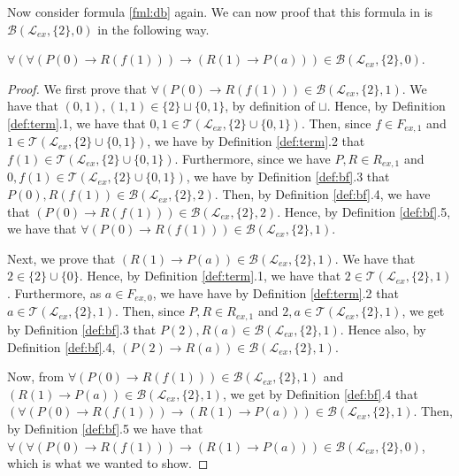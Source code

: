 Now consider formula \ref{fml:db} again. We can now proof that this formula in is $\mathcal{B}(\mathcal{L}_{ex},\{2\},0)$ in the following way.
\begin{lemma} $\forall(\forall(P(0) \rightarrow R(f(1))) \to (R(1) \to P(a))) \in \mathcal{B}(\mathcal{L}_{ex},\{2\},0)$.
\end{lemma}
\begin{proof}
  We first prove that $\forall(P(0) \rightarrow R(f(1))) \in \mathcal{B}(\mathcal{L}_{ex},\{2\},1)$. We have that $(0,1), (1,1) \in \{2\} \sqcup \{0,1\}$, by definition of $\sqcup$. Hence, by Definition \ref{def:term}.1, we have that $0, 1 \in \mathcal{T}(\mathcal{L}_{ex}, \{2\} \cup \{0,1\})$. Then, since $f \in F_{ex,1}$ and $1 \in \mathcal{T}(\mathcal{L}_{ex}, \{2\} \cup \{0,1\})$, we have by Definition \ref{def:term}.2 that $f(1) \in \mathcal{T}(\mathcal{L}_{ex}, \{2\} \cup \{0,1\})$. Furthermore, since we have $P, R \in R_{ex,1}$ and $0, f(1) \in \mathcal{T}(\mathcal{L}_{ex}, \{2\} \cup \{0,1\})$, we have by Definition \ref{def:bf}.3 that $P(0), R(f(1)) \in \mathcal{B}(\mathcal{L}_{ex},\{2\},2)$. Then, by Definition \ref{def:bf}.4, we have that $(P(0) \rightarrow R(f(1))) \in \mathcal{B}(\mathcal{L}_{ex},\{2\},2)$. Hence, by Definition \ref{def:bf}.5, we have that $\forall(P(0) \rightarrow R(f(1))) \in \mathcal{B}(\mathcal{L}_{ex},\{2\},1)$.

  Next, we prove that $(R(1) \to P(a)) \in \mathcal{B}(\mathcal{L}_{ex},\{2\},1)$. We have that $2 \in \{2\} \cup \{0\}$. Hence, by Definition \ref{def:term}.1, we have that $2 \in \mathcal{T}(\mathcal{L}_{ex},\{2\},1)$. Furthermore, as $a \in F_{ex,0}$, we have have by Definition \ref{def:term}.2 that $a \in \mathcal{T}(\mathcal{L}_{ex},\{2\},1)$. Then, since $P, R \in R_{ex,1}$ and $2, a \in \mathcal{T}(\mathcal{L}_{ex},\{2\},1)$, we get by Definition \ref{def:bf}.3 that $P(2), R(a) \in \mathcal{B}(\mathcal{L}_{ex},\{2\},1)$. Hence also, by Definition \ref{def:bf}.4, $(P(2) \to R(a)) \in \mathcal{B}(\mathcal{L}_{ex},\{2\},1)$.

  Now, from $\forall(P(0) \rightarrow R(f(1))) \in \mathcal{B}(\mathcal{L}_{ex},\{2\},1)$ and $(R(1) \to P(a)) \in \mathcal{B}(\mathcal{L}_{ex},\{2\},1)$, we get by Definition \ref{def:bf}.4 that $(\forall(P(0) \rightarrow R(f(1))) \to (R(1) \to P(a))) \in \mathcal{B}(\mathcal{L}_{ex},\{2\},1)$. Then, by Definition \ref{def:bf}.5 we have that $\forall(\forall(P(0) \rightarrow R(f(1))) \to (R(1) \to P(a))) \in \mathcal{B}(\mathcal{L}_{ex},\{2\},0)$, which is what we wanted to show. 
\end{proof}

